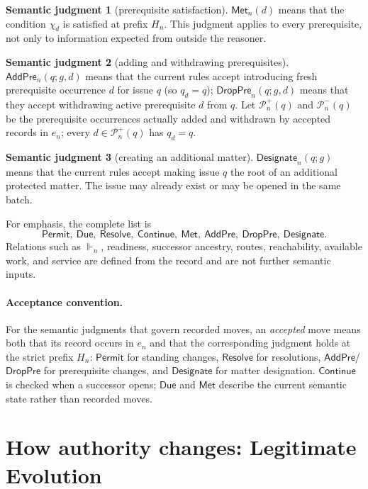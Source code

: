 \documentclass[11pt]{article}
\theoremstyle{definition}
\newtheorem*{semantics}{Semantic judgment}
\theoremstyle{remark}
\newcommand{\Permit}{\mathsf{Permit}}
\newcommand{\Due}{\mathsf{Due}}
\newcommand{\Resolve}{\mathsf{Resolve}}
\newcommand{\Continue}{\mathsf{Continue}}
\newcommand{\Met}{\mathsf{Met}}
\newcommand{\AddPre}{\mathsf{AddPre}}
\newcommand{\DropPre}{\mathsf{DropPre}}
\newcommand{\Designate}{\mathsf{Designate}}
\newcommand{\Pre}{\mathcal P}
\begin{document}
\begin{semantics}[prerequisite satisfaction]
$\Met_n(d)$ means that the condition $\chi_d$ is satisfied at prefix $H_n$.
This judgment applies to every prerequisite, not only to information expected
from outside the reasoner.
\end{semantics}

\begin{semantics}[adding and withdrawing prerequisites]
$\AddPre_n(q;g,d)$ means that the current rules accept introducing fresh
prerequisite occurrence $d$ for issue $q$ (so $q_d=q$); $\DropPre_n(q;g,d)$
means that they accept withdrawing active prerequisite $d$ from $q$. Let
$\Pre_n^+(q)$ and $\Pre_n^-(q)$ be the prerequisite occurrences actually added
and withdrawn by accepted records in $e_n$; every $d\in\Pre_n^+(q)$ has
$q_d=q$.
\end{semantics}

\begin{semantics}[creating an additional matter]
$\Designate_n(q;g)$ means that the current rules accept making issue $q$ the
root of an additional protected matter. The issue may already exist or may be
opened in the same batch.
\end{semantics}

For emphasis, the complete list is
\[
 \Permit,\ \Due,\ \Resolve,\ \Continue,\ \Met,\ \AddPre,\ \DropPre,\ \Designate.
\]
Relations such as $\Vdash_n$, readiness, successor ancestry, routes,
reachability, available work, and service are defined from the record and are
not further semantic inputs.

\paragraph{Acceptance convention.}
For the semantic judgments that govern recorded moves, an \emph{accepted} move
means both that its record occurs in $e_n$ and that the corresponding judgment
holds at the strict prefix $H_n$: $\Permit$ for standing changes, $\Resolve$
for resolutions, $\AddPre$/$\DropPre$ for prerequisite changes, and
$\Designate$ for matter designation. $\Continue$ is checked when a successor
opens; $\Due$ and $\Met$ describe the current semantic state rather than
recorded moves.

\section{How authority changes: Legitimate Evolution}\label{sec:standing}
\end{document}
